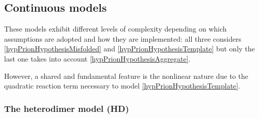\documentclass{article}
\begin{document}
        \subsection{Continuous models}\label{secContinuousModels}

            These models exhibit different levels of complexity depending on which assumptions are adopted and how they are implemented: all three considers \ref{hypPrionHypothesisMisfolded} and \ref{hypPrionHypothesisTemplate} but only the last one takes into account \ref{hypPrionHypothesisAggregate}. \cite{Fornari2019,Goriely2019}

            However, a shared and fundamental feature is the nonlinear nature due to the quadratic reaction term necessary to model \ref{hypPrionHypothesisTemplate}.

            \subsubsection{The heterodimer model (HD)}\label{secContinuousModelsHD}
\end{document}
